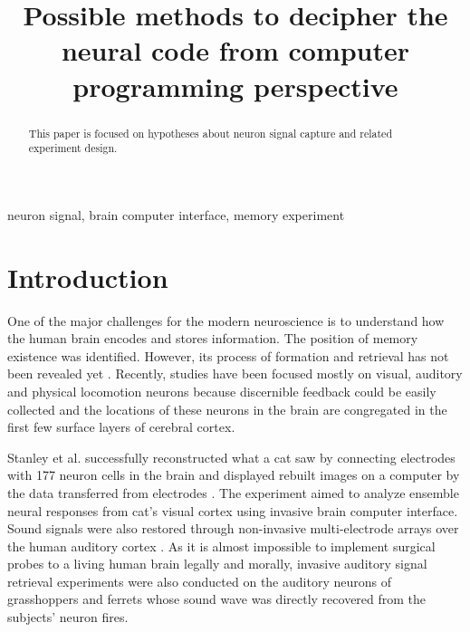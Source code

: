 \documentclass[conference]{IEEEtran}
\begin{document}
\title{Possible methods to decipher the neural code from computer programming perspective}

\author{
}
\maketitle

\begin{abstract}
This paper is focused on hypotheses about neuron signal capture and related experiment design.
\end{abstract}

\begin{IEEEkeywords}
neuron signal, brain computer interface, memory experiment
\end{IEEEkeywords}

\section{Introduction}
One of the major challenges for the modern neuroscience is to understand how the human brain encodes and stores information. The position of memory existence was identified. However, its process of formation and retrieval has not been revealed yet \cite{b1}. Recently, studies have been focused mostly on visual, auditory and physical locomotion neurons because discernible feedback could be easily collected and the locations of these neurons in the brain are congregated in the first few surface layers of cerebral cortex. 

Stanley et al. successfully reconstructed what a cat saw by connecting electrodes with 177 neuron cells in the brain and displayed rebuilt images on a computer by the data transferred from electrodes \cite{b3}. The experiment aimed to analyze ensemble neural responses from cat's visual cortex using invasive brain computer interface. Sound signals were also restored through non-invasive multi-electrode arrays over the human auditory cortex \cite{b2}. As it is almost impossible to implement surgical probes to a living human brain legally and morally, invasive auditory signal retrieval experiments were also conducted on the auditory neurons of grasshoppers and ferrets \cite{b4,b5} whose sound wave was directly recovered from the subjects' neuron fires. 
\end{document}

